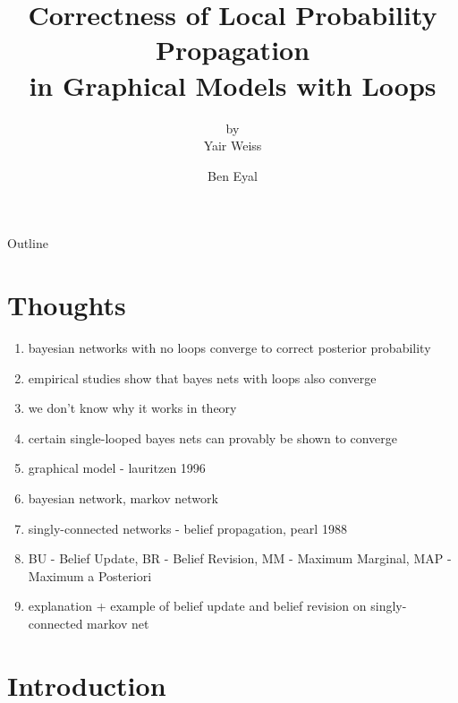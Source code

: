 \documentclass[handout]{beamer}
\title[]{Correctness of Local Probability Propagation\\in Graphical Models with Loops}
\subtitle{by\\Yair Weiss}
\author{Ben Eyal}
\begin{document}
\begin{frame}
    \titlepage
\end{frame}

\begin{frame}{Outline}
    \tableofcontents
\end{frame}

\section{Thoughts}
\begin{frame}
    \begin{enumerate}
        \item bayesian networks with no loops converge to correct posterior probability
        \item empirical studies show that bayes nets with loops also converge
        \item we don't know why it works in theory
        \item certain single-looped bayes nets can provably be shown to converge
        \item graphical model - lauritzen 1996
        \item bayesian network, markov network
        \item singly-connected networks - belief propagation, pearl 1988
        \item BU - Belief Update, BR - Belief Revision, MM - Maximum Marginal, MAP - Maximum a Posteriori
        \item explanation + example of belief update and belief revision on singly-connected markov net
    \end{enumerate}
\end{frame}
\section{Introduction}
\end{document}
